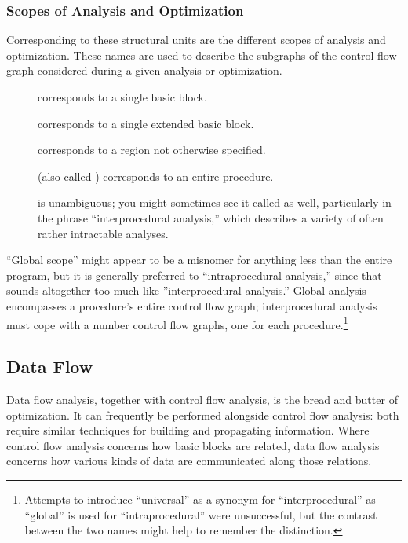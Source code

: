 \subsubsection{Scopes of Analysis and Optimization}
Corresponding to these structural units are the different scopes of analysis and optimization. These names are used to describe the subgraphs of the control flow graph considered during a given analysis or optimization.
\begin{description}
\item[] corresponds to a single basic block.
\item[] corresponds to a single extended basic block.
\item[] corresponds to a region not otherwise specified.
\item[] (also called ) corresponds to an entire procedure.
\item[] is unambiguous; you might sometimes see it called  as well, particularly in the phrase ``interprocedural analysis,'' which describes a variety of often rather intractable analyses.
\end{description}
``Global scope'' might appear to be a misnomer for anything less than the entire program, but it is generally preferred to ``intraprocedural analysis,'' since that sounds altogether too much like ''interprocedural analysis.'' Global analysis encompasses a procedure's entire control flow graph; interprocedural analysis must cope with a number control flow graphs, one for each procedure.\footnote{Attempts to introduce ``universal'' as a synonym for ``interprocedural'' as ``global'' is used for ``intraprocedural'' were unsuccessful, but the contrast between the two names might help to remember the distinction.}

\subsection{Data Flow}
Data flow analysis, together with control flow analysis, is the bread and butter of optimization. It can frequently be performed alongside control flow analysis: both require similar techniques for building and propagating information. Where control flow analysis concerns how basic blocks are related, data flow analysis concerns how various kinds of data are communicated along those relations.

